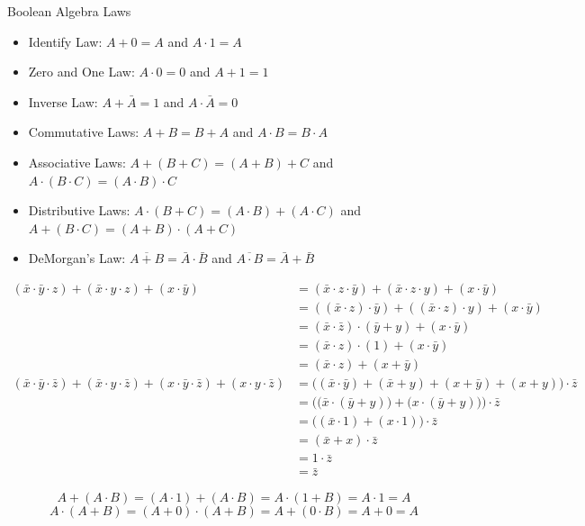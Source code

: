 \documentclass[12pt]{article}
\begin{document}
Boolean Algebra Laws \begin{itemize} 
\item Identify Law: $A + 0 = A$ and $A \cdot 1 = A$ 
\item Zero and One Law: $A \cdot 0 = 0$ and $A + 1 = 1$
\item Inverse Law: $A  + \bar{A} = 1$ and $A \cdot \bar{A} = 0$ 
\item Commutative Laws: $A + B = B + A$ and $A \cdot B = B \cdot A$ 
\item Associative Laws: $A + (B + C) = (A + B) + C$ and $A \cdot (B \cdot C) = (A \cdot B) \cdot C$ 
\item Distributive Laws: $A \cdot (B + C) = (A \cdot B) + (A \cdot C)$ and $A + (B \cdot C) = (A + B) \cdot (A + C)$ 
\item DeMorgan's Law: $\overline{A + B} = \bar{A} \cdot \bar{B}$ and $\overline{A \cdot B} = \bar{A} + \bar{B}$ 
\end{itemize} 

\begin{example} 
$$\begin{aligned} (\bar{x} \cdot \bar{y} \cdot z) + (\bar{x} \cdot y \cdot z) + (x \cdot \bar{y}) &= (\bar{x} \cdot z \cdot  \bar{y}) + (\bar{x} \cdot z \cdot y) + (x \cdot \bar{y}) \\ &= ((\bar{x} \cdot z) \cdot \bar{y}) + ((\bar{x} \cdot z) \cdot y) + (x \cdot \bar{y}) \\ &= (\bar{x} \cdot \bar{z}) \cdot (\bar{y} + y) + (x \cdot \bar{y}) \\ &= (\bar{x} \cdot z) \cdot (1) + (x \cdot \bar{y}) \\ &= (\bar{x} \cdot z) + (x + \bar{y}) \\ (\bar{x} \cdot \bar{y} \cdot \bar{z}) + (\bar{x} \cdot y \cdot \bar{z}) + (x \cdot \bar{y} \cdot \bar{z}) + (x \cdot y \cdot \bar{z}) &= \Big((\bar{x} \cdot \bar{y}) + (\bar{x} + y) + (x + \bar{y}) + (x + y)\Big) \cdot \bar{z} \\ &= \Bigg(\Big(\bar{x} \cdot (\bar{y} + y)\Big) + \Big(x \cdot (\bar{y} + y)\Big)\Bigg) \cdot \bar{z} \\ &= \Big( (\bar{x} \cdot 1) + (x \cdot 1)\Big) \cdot \bar{z} \\ &= (\bar{x} + x) \cdot \bar{z} \\ &= 1 \cdot \bar{z} \\ &= \bar{z}  \end{aligned} $$ \end{example} 

\begin{example} 
$$ A + (A \cdot B) = (A \cdot 1) + (A \cdot B) = A \cdot (1 + B) = A \cdot 1 = A $$ 
$$A \cdot (A + B) = (A + 0) \cdot (A + B) = A + (0 \cdot B) = A + 0 = A $$ 
\end{example} 
\end{document}
